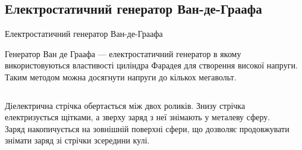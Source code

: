 \documentclass[onlytextwidth]{beamer}
\begin{document}
\subsection{Електростатичний генератор Ван-де-Граафа}



\begin{frame}{Електростатичний генератор Ван-де-Граафа}{}
	\begin{block}{}
		Генератор Ван де Граафа --- електростатичний генератор в якому використовуються властивості
		циліндра Фарадея для створення високої напруги. Таким методом можна досягнути напруги до
		кількох мегавольт.
	\end{block}
	\begin{columns}
		\begin{column}{0.7\linewidth}
			\begin{block}{}\justifying
				Діелектрична стрічка обертається між двох роликів. Знизу стрічка електризується
				щітками, а зверху заряд з неї знімають у металеву сферу. Заряд накопичується на
				зовнішній поверхні сфери, що дозволяє продовжувати знімати заряд зі стрічки
				зсередини кулі.
			\end{block}
		\end{column}
		\begin{column}{0.29\linewidth}\centering

\end{column}
\end{columns}
\end{frame}
\end{document}
